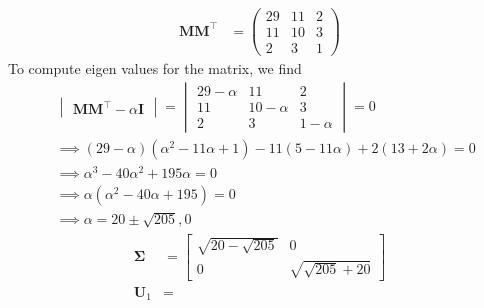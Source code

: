 \documentclass[12pt]{article}
\newcommand{\mydet}[1]{\ensuremath{\begin{vmatrix}#1\end{vmatrix}}}
\providecommand{\brak}[1]{\ensuremath{\left(#1\right)}}
\newcommand{\myvec}[1]{\ensuremath{\begin{pmatrix}#1\end{pmatrix}}}
\let\vec\mathbf
\begin{document}
\begin{enumerate}
\begin{align}
	\vec{M}\vec{M}^\top &= \myvec{29&11&2 \\ 11 & 10 & 3\\ 2&3&1} 
\end{align}
To compute eigen values for the matrix, we find
\begin{align}
	&\mydet{\vec{M}\vec{M}^\top - \alpha\vec{I}} = \mydet{29-\alpha & 11 & 2 \\ 11 & 10-\alpha & 3 \\ 2&3&1-\alpha} = 0\\
	&\implies \brak{29-\alpha}\brak{\alpha^2-11\alpha+1}-11\brak{5-11\alpha}+2\brak{13+2\alpha} = 0 \\
	&\implies \alpha^3-40\alpha^2+195\alpha = 0 \\
	&\implies \alpha\brak{\alpha^2-40\alpha+195} = 0 \\
	& \implies \alpha = 20\pm\sqrt{205}, 0 
\end{align}
\begin{align}
\vec{\Sigma} &= \left[\begin{matrix}\sqrt{20 - \sqrt{205}} & 0\\0 & \sqrt{\sqrt{205} + 20}\end{matrix}\right]  \\
	\vec{U}_1 &=

\end{align}
\end{enumerate}
\end{document}
